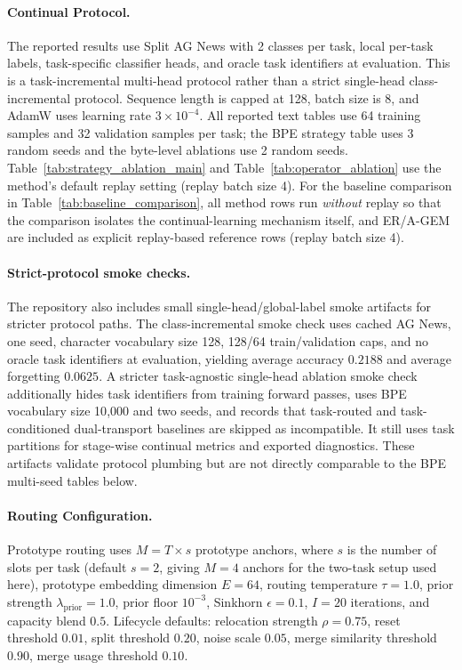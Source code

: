 \documentclass[11pt,a4paper]{article}
\theoremstyle{definition}
\begin{document}
\paragraph{Continual Protocol.} The reported results use Split AG News with 2 classes per task, local per-task labels, task-specific classifier heads, and oracle task identifiers at evaluation. This is a task-incremental multi-head protocol rather than a strict single-head class-incremental protocol. Sequence length is capped at 128, batch size is 8, and AdamW uses learning rate $3 \times 10^{-4}$. All reported text tables use 64 training samples and 32 validation samples per task; the BPE strategy table uses 3 random seeds and the byte-level ablations use 2 random seeds. Table~\ref{tab:strategy_ablation_main} and Table~\ref{tab:operator_ablation} use the method's default replay setting (replay batch size 4). For the baseline comparison in Table~\ref{tab:baseline_comparison}, all method rows run \emph{without} replay so that the comparison isolates the continual-learning mechanism itself, and ER/A-GEM are included as explicit replay-based reference rows (replay batch size 4).

\paragraph{Strict-protocol smoke checks.} The repository also includes small single-head/global-label smoke artifacts for stricter protocol paths. The class-incremental smoke check uses cached AG News, one seed, character vocabulary size 128, 128/64 train/validation caps, and no oracle task identifiers at evaluation, yielding average accuracy $0.2188$ and average forgetting $0.0625$. A stricter task-agnostic single-head ablation smoke check additionally hides task identifiers from training forward passes, uses BPE vocabulary size 10{,}000 and two seeds, and records that task-routed and task-conditioned dual-transport baselines are skipped as incompatible. It still uses task partitions for stage-wise continual metrics and exported diagnostics. These artifacts validate protocol plumbing but are not directly comparable to the BPE multi-seed tables below.

\paragraph{Routing Configuration.} Prototype routing uses $M = T \times s$ prototype anchors, where $s$ is the number of slots per task (default $s = 2$, giving $M = 4$ anchors for the two-task setup used here), prototype embedding dimension $E = 64$, routing temperature $\tau = 1.0$, prior strength $\lambda_{\text{prior}} = 1.0$, prior floor $10^{-3}$, Sinkhorn $\epsilon = 0.1$, $I = 20$ iterations, and capacity blend $0.5$. Lifecycle defaults: relocation strength $\rho = 0.75$, reset threshold $0.01$, split threshold $0.20$, noise scale $0.05$, merge similarity threshold $0.90$, merge usage threshold $0.10$.
\end{document}
